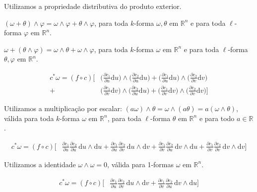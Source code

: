\documentclass[12pt,a4paper]{article}
\begin{document}
		Utilizamos a propriedade distributiva do produto exterior.
		
		$(\omega + \theta) \wedge \varphi = \omega \wedge \varphi + \theta \wedge \varphi$, para toda $k$-forma $\omega, \theta$ em $\mathbb{R}^n$ e para toda $\ell$-forma $\varphi$ em $\mathbb{R}^n$.
		
		$\omega + (\theta \wedge \varphi) = \omega \wedge \theta + \omega \wedge \varphi$, para toda $k$-forma $\omega$ em $\mathbb{R}^n$ e para toda $\ell$-forma $\theta, \varphi$ em $\mathbb{R}^n$.
		
		\begin{align}
			c^*\omega = (f \circ c) \biggl[ &\biggl(\frac{\partial c_1}{\partial u}\mathrm{d}u\biggl) \wedge \biggl(\frac{\partial c_2}{\partial u}\mathrm{d}u \biggl) 
			+ \biggl(\frac{\partial c_1}{\partial u}\mathrm{d}u\biggl) \wedge \biggl(\frac{\partial c_2}{\partial v}\mathrm{d}v \biggl) \\
			+ &\biggl(\frac{\partial c_1}{\partial v}\mathrm{d}v\biggl) \wedge \biggl(\frac{\partial c_2}{\partial u}\mathrm{d}u \biggl) 
			+ \biggl(\frac{\partial c_1}{\partial v}\mathrm{d}v\biggl) \wedge \biggl(\frac{\partial c_2}{\partial v}\mathrm{d}v \biggl) \biggl]
		\end{align}		

		Utilizamos a multiplica\c{c}\~ao por escalar: $(a\omega) \wedge \theta = \omega \wedge (a \theta) = a (\omega \wedge \theta)$, v\'alida para toda $k$-forma $\omega$ em $\mathbb{R}^n$, para toda $\ell$-forma $\theta$ em $\mathbb{R}^n$ e para todo $a \in \mathbb{R}$.
		
		\begin{align}
			c^*\omega = (f \circ c) \biggl[ &\frac{\partial c_1}{\partial u} \frac{\partial c_2}{\partial u}\,\mathrm{d}u \wedge \mathrm{d}u 
			+ \frac{\partial c_1}{\partial u} \frac{\partial c_2}{\partial v}\,\mathrm{d}u \wedge \mathrm{d}v 
			+ \frac{\partial c_1}{\partial v} \frac{\partial c_2}{\partial u}\,\mathrm{d}v \wedge \mathrm{d}u 
			+ \frac{\partial c_1}{\partial v} \frac{\partial c_2}{\partial v}\,\mathrm{d}v \wedge \mathrm{d}v \biggl]
		\end{align}		

		Utilizamos a identidade $\omega \wedge \omega = 0$, v\'alida para 1-formas $\omega$ em $\mathbb{R}^n$.
		
		\begin{align}
			c^*\omega = (f \circ c) \biggl[ &\frac{\partial c_1}{\partial u} \frac{\partial c_2}{\partial v}\,\mathrm{d}u \wedge \mathrm{d}v 
			+ \frac{\partial c_1}{\partial v} \frac{\partial c_2}{\partial u}\,\mathrm{d}v \wedge \mathrm{d}u \biggl]
		\end{align}		
\end{document}
